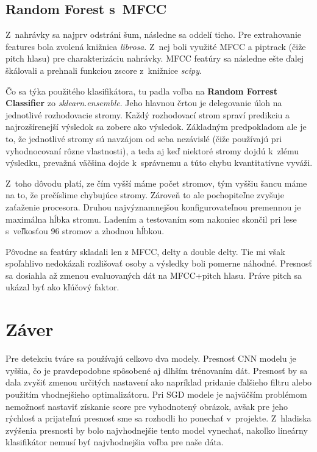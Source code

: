 \documentclass[11pt, a4paper]{article}
\begin{document}
			\subsection{Random Forest s~MFCC}
			Z~nahrávky sa najprv odstráni šum, následne sa oddelí ticho. Pre extrahovanie features bola zvolená knižnica \emph{librosa}. Z~nej boli využité MFCC a piptrack (čiže pitch hlasu) pre charakterizáciu nahrávky. MFCC featúry sa následne ešte ďalej škálovali a prehnali funkciou zscore z~knižnice \emph{scipy}.
			
			Čo sa týka použitého klasifikátora, tu padla voľba na \textbf{Random Forrest Classifier} zo \emph{sklearn.ensemble}. Jeho hlavnou črtou je delegovanie úloh na jednotlivé rozhodovacie stromy. Každý rozhodovací strom spraví predikciu a najrozšírenejší výsledok sa zobere ako výsledok. Základným predpokladom ale je to, že jednotlivé stromy sú navzájom od seba nezávislé (čiže používajú pri vyhodnocovaní rôzne vlastnosti), a teda aj keď niektoré stromy dojdú k~zlému výsledku, prevažná väčšina dojde k~správnemu a túto chybu kvantitatívne vyváži.
			
			Z~toho dôvodu platí, ze čím vyšší máme počet stromov, tým vyššiu šancu máme na to, že prečíslime chybujúce stromy. Zároveň to ale pochopiteľne zvyšuje zaťaženie procesora. Druhou najvýznamnejšou konfigurovateľnou premennou je maximálna hĺbka stromu.
			Ladením a testovaním som nakoniec skončil pri lese s~veľkosťou 96 stromov a zhodnou hĺbkou.

			Pôvodne sa featúry skladali len z MFCC, delty a double delty. Tie mi však spoľahlivo nedokázali rozlišovať osoby a výsledky boli pomerne náhodné. Presnosť sa dosiahla až zmenou evaluovaných dát na MFCC+pitch hlasu. Práve pitch sa ukázal byť ako kľúčový faktor.

\section{Záver}
	Pre detekciu tváre sa používajú celkovo dva modely. Presnosť CNN modelu je vyššia, čo je pravdepodobne spôsobené aj dlhším trénovaním dát. Presnosť by sa dala zvyšiť zmenou určitých nastavení ako napríklad pridanie ďalšieho filtru alebo použitím vhodnejšieho optimalizátoru. Pri SGD modele je najväčším problémom nemožnosť nastaviť získanie score pre vyhodnotený obrázok, avšak pre jeho rýchlosť a prijateľnú presnosť sme sa rozhodli ho ponechať v~projekte. Z~hladiska zvýšenia presnosti by bolo najvhodnejšie tento model vynechať, nakoľko lineárny klasifikátor nemusí byť najvhodnejšia voľba pre naše dáta. 
\\
\end{document}
